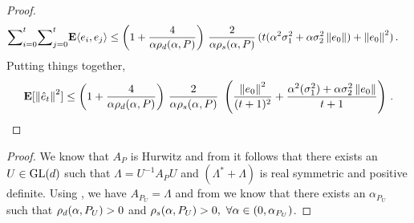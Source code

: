 \begin{proof}
\begin{align*}
{\sum}_{i=0}^{t}{\sum}_{j=0}^{t} \mathbf{E}\langle e_i,e_j\rangle
&\leq \left(1+\frac4{\alpha\rho_d(\alpha,P) }\right)\, \frac2{\alpha\rho_s(\alpha,P)}\, (t(\alpha^2{\sigma}_1^2+\alpha {\sigma}^2_2\left\| e_0\right\|) +\left\| e_0\right\|^2)\,.
\end{align*}
Putting things together,
\begin{align}
\mathbf{E}[\left\| \hat{e}_t\right\|^2]
\leq \left(1+\frac4{\alpha\rho_d(\alpha,P)}\right)\, \frac2{\alpha\rho_s(\alpha,P)}\, \,
\left(\frac{\left\| e_0\right\|^2}{(t+1)^2}+ \frac{\alpha^2(\sigma_1^2)+\alpha \sigma_2^2\left\| e_0\right\|}{t+1} \right)\,.
\end{align}
\end{proof}


{}
\begin{proof}
We know that $A_P$ is Hurwitz and from   it follows that there exists an $U\in \mathrm{GL}(d)$ such that  $\Lambda=U^{-1} A_P U$ and $(\Lambda^*+\Lambda)$ is real symmetric and positive definite. Using , we have $A_{P_U}=\Lambda$ and from  we know that there exists an $\alpha_{P_U}$ such that $\rho_d(\alpha,P_U)>0$ and $\rho_s(\alpha,P_U)>0,~\forall \alpha \in (0,\alpha_{P_U})$.

\end{proof}



